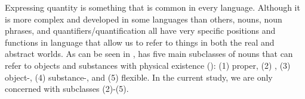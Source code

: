 \documentclass[output=paper]{langsci/langscibook}
\begin{document}
Expressing quantity is something that is common in every language. Although it is more complex and developed in some languages than others, nouns, noun phrases, and quantifiers/quantification all have very specific positions and functions in language that allow us to refer to things in both the real and abstract worlds. As can be seen in ,  has five main subclasses of nouns that can refer to objects and substances with physical existence (\citealt{LeechSvartvik1975}): (1) proper, (2) , (3) object-, (4) substance-, and (5) flexible. In the current study, we are only concerned with subclasses (2)-(5).

\begin{table}
\caption{Noun subclasses in English}
\label{tab:thomas:1}
\small
{}
\end{table}
\end{document}
